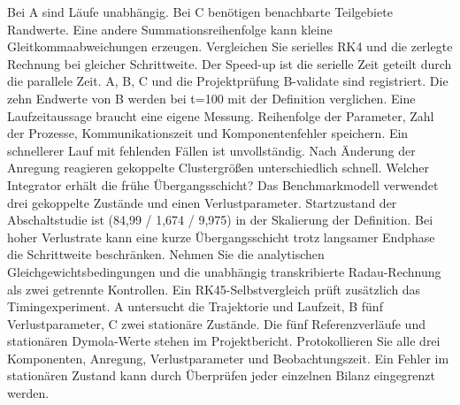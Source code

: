 Bei A sind Läufe unabhängig. Bei C benötigen benachbarte Teilgebiete Randwerte. Eine andere Summationsreihenfolge kann kleine Gleitkommaabweichungen erzeugen.
Vergleichen Sie serielles RK4 und die zerlegte Rechnung bei gleicher Schrittweite. Der Speed-up ist die serielle Zeit geteilt durch die parallele Zeit.
A, B, C und die Projektprüfung B-validate sind registriert. Die zehn Endwerte von B werden bei t=100 mit der Definition verglichen. Eine Laufzeitaussage braucht eine eigene Messung.
Reihenfolge der Parameter, Zahl der Prozesse, Kommunikationszeit und Komponentenfehler speichern. Ein schnellerer Lauf mit fehlenden Fällen ist unvollständig.
Nach Änderung der Anregung reagieren gekoppelte Clustergrößen unterschiedlich schnell. Welcher Integrator erhält die frühe Übergangsschicht?
Das Benchmarkmodell verwendet drei gekoppelte Zustände und einen Verlustparameter. Startzustand der Abschaltstudie ist (84,99 / 1,674 / 9,975) in der Skalierung der Definition.
Bei hoher Verlustrate kann eine kurze Übergangsschicht trotz langsamer Endphase die Schrittweite beschränken.
Nehmen Sie die analytischen Gleichgewichtsbedingungen und die unabhängig transkribierte Radau-Rechnung als zwei getrennte Kontrollen. Ein RK45-Selbstvergleich prüft zusätzlich das Timingexperiment.
A untersucht die Trajektorie und Laufzeit, B fünf Verlustparameter, C zwei stationäre Zustände. Die fünf Referenzverläufe und stationären Dymola-Werte stehen im Projektbericht.
Protokollieren Sie alle drei Komponenten, Anregung, Verlustparameter und Beobachtungszeit. Ein Fehler im stationären Zustand kann durch Überprüfen jeder einzelnen Bilanz eingegrenzt werden.
